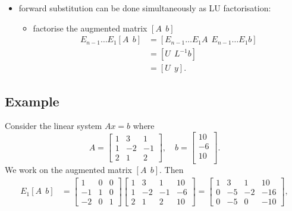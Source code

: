 \documentclass[11pt]{article}
\providecommand{\tightlist}{%
      \setlength{\itemsep}{0pt}\setlength{\parskip}{0pt}}
\begin{document}
\begin{itemize}
\tightlist
\item
  forward substitution can be done simultaneously as LU factorisation:

  \begin{itemize}
  \tightlist
  \item
    factorise the augmented matrix \([A\ \ b]\)
    \[\begin{aligned} E_{n-1}\dots E_1 [A \ \ b] &= 
    [E_{n-1} \dots E_1 A \ \ E_{n-1}\dots E_1 b] \\
    &= [U \ \ L^{-1} b] \\ &= [U \ \ y].\end{aligned}\]
  \end{itemize}
\end{itemize}

    \subsection{Example}\label{example}

Consider the linear system \(A x =b\) where
\[A = \left[\begin{array}{rrrr}
1  &  3  & 1 \\
1  & -2  & -1\\
2  & 1  & 2
\end{array}\right], \quad
b = \left[ \begin{array}{rrrr}
10\\ -6 \\ 10\\
\end{array}\right].\] We work on the augmented matrix \([A \ \ b]\).
Then \[\begin{aligned}
E_1 [A \ \ b]\! &= \!\!\left[\begin{array}{rrrr}
1 & 0 & 0\\
-1 & 1 & 0 \\
-2 & 0 & 1
\end{array}\right] \left[\begin{array}{rrrr}
1  &  3  & 1 & 10\\
1  & -2  & -1 & -6\\
2  & 1  & 2  &  10
\end{array}\right]
\!\!=\!\! \left[\begin{array}{rrrr}
1  &  3  & 1 & 10\\
0  & -5  & -2 & -16\\
0  & -5  &  0 & -10
\end{array}\right],\end{aligned}\]
\end{document}
